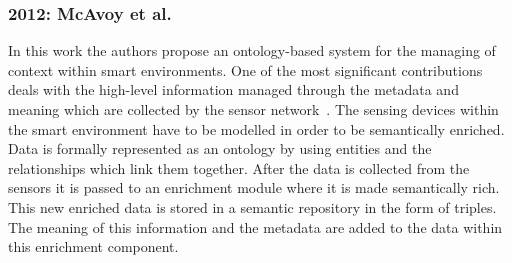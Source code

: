 \subsubsection{2012: McAvoy et al.}
\label{sec:mcavoy}

In this work the authors propose an ontology-based system for the managing of 
context within smart environments. One of the most significant contributions 
deals with the high-level information managed through the metadata and meaning 
which are collected by the sensor network~\citep{mcavoy_ontology_based_2012}. 
The sensing devices within the smart environment have to be modelled in order 
to be semantically enriched. Data is formally represented as an ontology by 
using entities and the relationships which link them together. After the data 
is collected from the sensors it is passed to an enrichment module where it is 
made semantically rich. This new enriched data is stored in a semantic 
repository in the form of triples. The meaning of this information and the 
metadata are added to the data within this enrichment component. 
